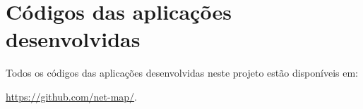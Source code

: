 \chapter{Códigos das aplicações desenvolvidas}
\label{github}
Todos os códigos das aplicações desenvolvidas neste projeto estão disponíveis em:
\par 
\url{https://github.com/net-map/}.
